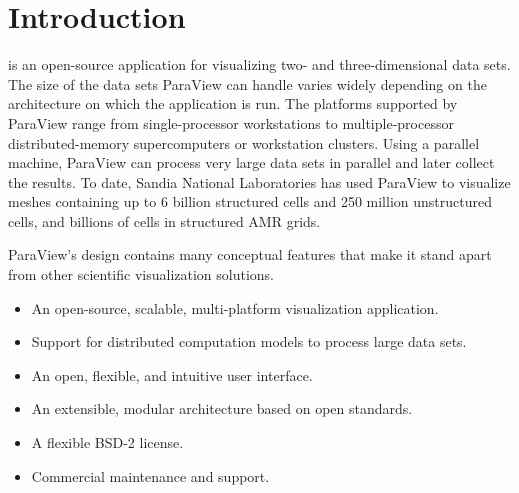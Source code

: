 \chapter{Introduction}
\label{chap:Introduction}

 is an open-source application for visualizing two- and
three-dimensional data sets.  The size of the data sets ParaView can handle
varies widely depending on the architecture on which the application is
run.  The platforms supported by ParaView range from single-processor
workstations to multiple-processor distributed-memory supercomputers or
workstation clusters.  Using a parallel machine, ParaView can process very
large data sets in parallel and later collect the results.  To date, Sandia
National Laboratories has used ParaView to visualize meshes containing up
to 6 billion structured cells and 250 million unstructured cells, and
billions of cells in structured AMR grids.

ParaView's design contains many conceptual features that make it stand
apart from other scientific visualization solutions.

\begin{itemize}
\item An open-source, scalable, multi-platform visualization application.
\item Support for distributed computation models to process large data sets.
\item An open, flexible, and intuitive user interface.
\item An extensible, modular architecture based on open standards.
\item A flexible BSD-2 license.
\item Commercial maintenance and support.
\end{itemize}


